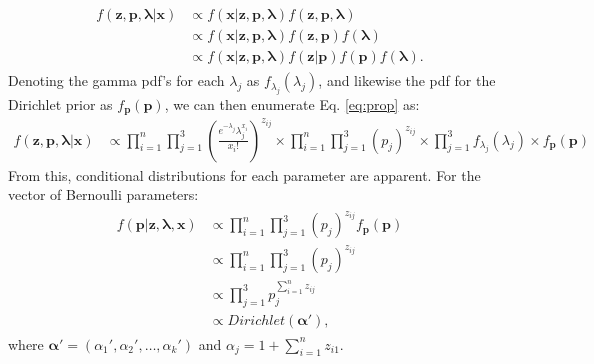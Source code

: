 \begin{DoubleSpace*}
\begin{align}
\label{eq:prop}
\begin{split}
f(\textbf{z},\textbf{p},\boldsymbol{\lambda}|\textbf{x}) &\propto f(\textbf{x}|\textbf{z},\textbf{p},\boldsymbol{\lambda}) f(\textbf{z},\textbf{p},\boldsymbol{\lambda}) \\
&\propto f(\textbf{x}|\textbf{z},\textbf{p},\boldsymbol{\lambda})f(\textbf{z},\textbf{p}) f(\boldsymbol{\lambda}) \\
&\propto f(\textbf{x}|\textbf{z},\textbf{p},\boldsymbol{\lambda})f(\textbf{z}|\textbf{p}) f(\textbf{p}) f(\boldsymbol{\lambda}).
\end{split}
\end{align}
Denoting the gamma pdf's for each $\lambda_j$ as $f_{\lambda_j}(\lambda_j)$, and likewise the pdf for the Dirichlet prior as $f_{\textbf{p}}(\textbf{p})$, we can then enumerate Eq. \ref{eq:prop} as:
\begin{align}
	f(\textbf{z},\textbf{p},\boldsymbol{\lambda}|\textbf{x}) &\propto \prod_{i=1}^{n} \prod_{j=1}^3 \left(\frac{e^{-\lambda_j}\lambda_j^{x_i}}{x_i!}\right)^{z_{ij}} \times \prod_{i=1}^{n} \prod_{j=1}^3 (p_j)^{z_{ij}} \times \prod_{j=1}^3 f_{\lambda_j}(\lambda_j) \times f_{\textbf{p}}(\textbf{p})
\end{align}
From this, conditional distributions for each parameter are apparent. For the vector of Bernoulli parameters:
\begin{align}
\begin{split}
	f(\textbf{p}|\textbf{z},\boldsymbol{\lambda},\textbf{x}) &\propto \prod_{i=1}^n \prod_{j=1}^3 (p_j)^{z_{ij}} f_{\textbf{p}}(\textbf{p}) \\
	&\propto \prod_{i=1}^n \prod_{j=1}^3 (p_j)^{z_{ij}} \\
	&\propto \prod_{j=1}^3 p_j^{\sum_{i=1}^n z_{ij}} \\
	&\propto Dirichlet(\boldsymbol{\alpha}'),
\end{split}
\end{align}
where $\boldsymbol{\alpha}'=(\alpha_{1}',\alpha_{2}',\hdots, \alpha_{k}')$ and $\alpha_{j}=1+\sum_{i=1}^n z_{i1}$.


\end{DoubleSpace*}
